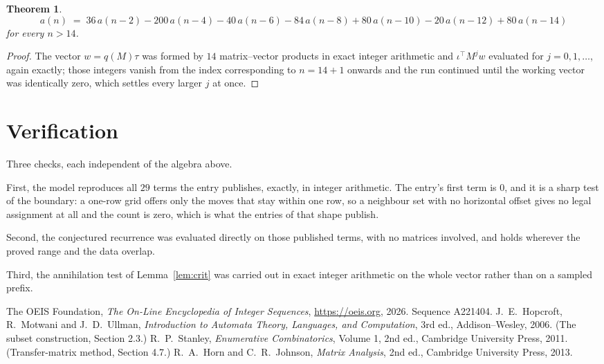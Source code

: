 \documentclass[11pt,a4paper]{article}
\theoremstyle{plain}
\newtheorem{theorem}{Theorem}
\theoremstyle{definition}
\begin{document}
\begin{theorem}
\[
a(n)\;=\;36\,a(n-2) - 200\,a(n-4) - 40\,a(n-6) - 84\,a(n-8) + 80\,a(n-10) - 20\,a(n-12) + 80\,a(n-14)
\]
for every $n>14$.
\end{theorem}

\begin{proof}
The vector $w=q(M)\tau$ was formed by $14$ matrix--vector products in exact integer
arithmetic and $\iota^{\!\top}M^{j}w$ evaluated for $j=0,1,\dots$, again exactly; those
integers vanish from the index corresponding to $n=14+1$ onwards and the run continued
until the working vector was identically zero, which settles every larger $j$ at once.
\end{proof}

\section{Verification}

Three checks, each independent of the algebra above.

First, the model reproduces all $29$ terms the entry publishes, exactly, in integer
arithmetic. The entry's first term is $0$, and it is a sharp test of the boundary: a
one-row grid offers only the moves that stay within one row, so a neighbour set with no
horizontal offset gives no legal assignment at all and the count is zero, which is what the
entries of that shape publish.

Second, the conjectured recurrence was evaluated directly on those published terms, with no
matrices involved, and holds wherever the proved range and the data overlap.

Third, the annihilation test of Lemma~\ref{lem:crit} was carried out in exact integer
arithmetic on the whole vector rather than on a sampled prefix.

\begin{thebibliography}{9}
 The OEIS Foundation, \emph{The On-Line Encyclopedia of Integer
Sequences}, \url{https://oeis.org}, 2026. Sequence A221404.
 J.~E.~Hopcroft, R.~Motwani and J.~D.~Ullman, \emph{Introduction to Automata
Theory, Languages, and Computation}, 3rd ed., Addison--Wesley, 2006. (The subset
construction, Section 2.3.)
 R.~P.~Stanley, \emph{Enumerative Combinatorics}, Volume 1, 2nd ed.,
Cambridge University Press, 2011. (Transfer-matrix method, Section 4.7.)
 R.~A.~Horn and C.~R.~Johnson, \emph{Matrix Analysis}, 2nd ed., Cambridge
University Press, 2013.
\end{thebibliography}
\end{document}
